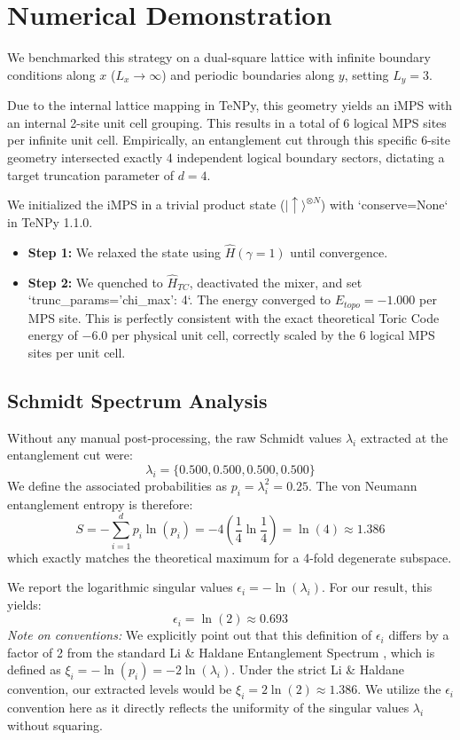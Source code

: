 \documentclass[aps,prb,reprint,superscriptaddress,amsmath,amssymb]{revtex4-2}
\begin{document}
\section{\label{sec:2d}Numerical Demonstration}
We benchmarked this strategy on a dual-square lattice with infinite boundary conditions along $x$ ($L_x \to \infty$) and periodic boundaries along $y$, setting $L_y = 3$. 

Due to the internal lattice mapping in TeNPy, this geometry yields an iMPS with an internal 2-site unit cell grouping. This results in a total of 6 logical MPS sites per infinite unit cell. Empirically, an entanglement cut through this specific 6-site geometry intersected exactly 4 independent logical boundary sectors, dictating a target truncation parameter of $d=4$.

We initialized the iMPS in a trivial product state ($|\uparrow\rangle^{\otimes N}$) with `conserve=None` in TeNPy 1.1.0. 
\begin{itemize}
    \item \textbf{Step 1:} We relaxed the state using $\hat{H}(\gamma=1)$ until convergence.
    \item \textbf{Step 2:} We quenched to $\hat{H}_{TC}$, deactivated the mixer, and set `trunc_params={'chi_max': 4}`. The energy converged to $E_{topo} = -1.000$ per MPS site. This is perfectly consistent with the exact theoretical Toric Code energy of $-6.0$ per physical unit cell, correctly scaled by the 6 logical MPS sites per unit cell.
\end{itemize}

\subsection{Schmidt Spectrum Analysis}
Without any manual post-processing, the raw Schmidt values $\lambda_i$ extracted at the entanglement cut were:
\begin{equation}
    \lambda_i = \{0.500, 0.500, 0.500, 0.500\}
\end{equation}
We define the associated probabilities as $p_i = \lambda_i^2 = 0.25$. The von Neumann entanglement entropy is therefore:
\begin{equation}
    S = -\sum_{i=1}^{d} p_i \ln(p_i) = -4 \left( \frac{1}{4} \ln \frac{1}{4} \right) = \ln(4) \approx 1.386
\end{equation}
which exactly matches the theoretical maximum for a 4-fold degenerate subspace.

We report the logarithmic singular values $\epsilon_i = -\ln(\lambda_i)$. For our result, this yields:
\begin{equation}
    \epsilon_i = \ln(2) \approx 0.693
\end{equation}
\noindent\textit{Note on conventions:} We explicitly point out that this definition of $\epsilon_i$ differs by a factor of 2 from the standard Li \& Haldane Entanglement Spectrum \cite{lihaldane2008}, which is defined as $\xi_i = -\ln(p_i) = -2\ln(\lambda_i)$. Under the strict Li \& Haldane convention, our extracted levels would be $\xi_i = 2\ln(2) \approx 1.386$. We utilize the $\epsilon_i$ convention here as it directly reflects the uniformity of the singular values $\lambda_i$ without squaring.
\end{document}
